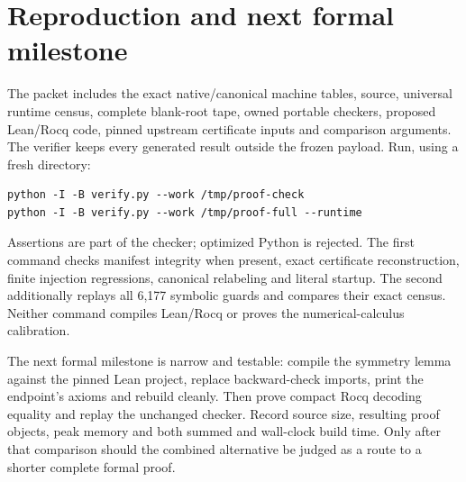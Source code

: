 \documentclass[11pt]{article}
\begin{document}
\section{Reproduction and next formal milestone}
The packet includes the exact native/canonical machine tables, source, universal runtime census, complete blank-root tape, owned portable checkers, proposed Lean/Rocq code, pinned upstream certificate inputs and comparison arguments. The verifier keeps every generated result outside the frozen payload. Run, using a fresh directory:
\begin{verbatim}
python -I -B verify.py --work /tmp/proof-check
python -I -B verify.py --work /tmp/proof-full --runtime
\end{verbatim}
Assertions are part of the checker; optimized Python is rejected. The first command checks manifest integrity when present, exact certificate reconstruction, finite injection regressions, canonical relabeling and literal startup. The second additionally replays all 6,177 symbolic guards and compares their exact census. Neither command compiles Lean/Rocq or proves the numerical-calculus calibration.

The next formal milestone is narrow and testable: compile the symmetry lemma against the pinned Lean project, replace backward-check imports, print the endpoint's axioms and rebuild cleanly. Then prove compact Rocq decoding equality and replay the unchanged checker. Record source size, resulting proof objects, peak memory and both summed and wall-clock build time. Only after that comparison should the combined alternative be judged as a route to a shorter complete formal proof.
\end{document}
